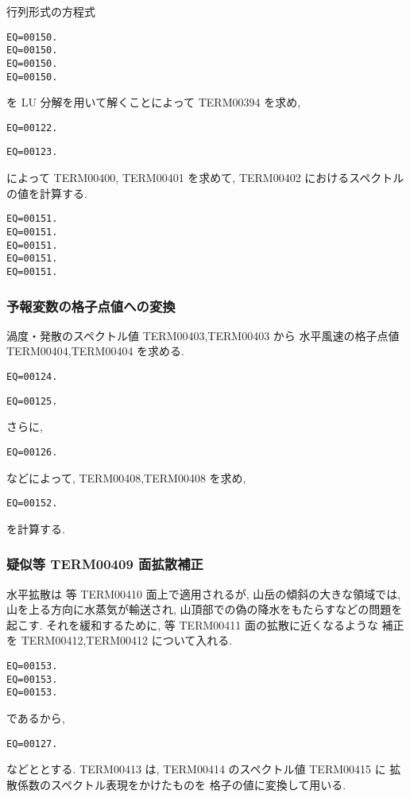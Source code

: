 行列形式の方程式
\begin{verbatim}
EQ=00150.
EQ=00150.
EQ=00150.
EQ=00150.
\end{verbatim}
%
を LU 分解を用いて解くことによって 
TERM00394 を求め,
%
\begin{verbatim}
EQ=00122.
\end{verbatim}
%
\begin{verbatim}
EQ=00123.
\end{verbatim}

%
によって
TERM00400,
TERM00401 
を求めて, TERM00402 におけるスペクトルの値を計算する.
\begin{verbatim}
EQ=00151.
EQ=00151.
EQ=00151.
EQ=00151.
EQ=00151.
\end{verbatim}

\subsubsection{予報変数の格子点値への変換}


渦度・発散のスペクトル値 TERM00403,TERM00403 から
水平風速の格子点値 TERM00404,TERM00404 を求める.
\begin{verbatim}
EQ=00124.
\end{verbatim}
%
\begin{verbatim}
EQ=00125.
\end{verbatim}

さらに,
\begin{verbatim}
EQ=00126.
\end{verbatim}
などによって, TERM00408,TERM00408 を求め,
\begin{verbatim}
EQ=00152.
\end{verbatim}
を計算する.

\subsubsection{疑似等 TERM00409 面拡散補正}

水平拡散は 等 TERM00410 面上で適用されるが,
山岳の傾斜の大きな領域では, 山を上る方向に水蒸気が輸送され,
山頂部での偽の降水をもたらすなどの問題を起こす.
それを緩和するために, 等 TERM00411 面の拡散に近くなるような
補正を TERM00412,TERM00412 について入れる.

\begin{verbatim}
EQ=00153.
EQ=00153.
EQ=00153.
\end{verbatim}
%
であるから,
\begin{verbatim}
EQ=00127.
\end{verbatim}
などととする.
TERM00413 は, TERM00414 のスペクトル値 TERM00415 に
拡散係数のスペクトル表現をかけたものを
格子の値に変換して用いる.

